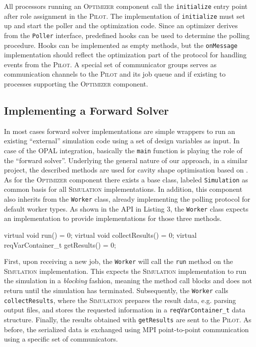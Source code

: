 \documentclass[%
preprint,
preprint,
linenumbers,
amsmath,amssymb,
aps,
prstab,
]{revtex4-1}
\begin{document}
All processors running an \textsc{Optimizer} component call the
  \texttt{initialize} entry point after role assignment in the
  \textsc{Pilot}.
The implementation of \texttt{initialize} must set up and start the poller and
  the optimization code.
Since an optimizer derives from the \texttt{Poller} interface, predefined
  hooks can be used to determine the polling procedure.
Hooks can be implemented as empty methods, but the \texttt{onMessage}
  implementation should reflect the optimization part of the protocol for
  handling events from the \textsc{Pilot}.
A special set of communicator groups serves as communication channels to the
  \textsc{Pilot} and its job queue and if existing to processes supporting the
  \textsc{Optimizer} component.


\subsection{Implementing a Forward Solver}

In most cases forward solver implementations are simple wrappers to run
  an existing ``external'' simulation code using a set of design variables as
  input. In case of the OPAL integration, basically the \texttt{main} function is
  playing the role of the ``forward solver''. Underlying the general nature of our approach, 
  in a similar project, the described methods are used for cavity shape optimisation based on \cite{ARBENZ2008381}. 
As for the \textsc{Optimizer} component there exists a base class, labeled
  \texttt{Simulation} as common basis for all \textsc{Simulation}
  implementations.
In addition, this component also inherits from the \texttt{Worker} class,
  already implementing the polling protocol for default worker types.
As shown in the API in Listing 3, the \texttt{Worker} class expects an
  implementation to provide implementations for those three methods.

\begin{code}
virtual void run() = 0;
virtual void collectResults() = 0;
virtual reqVarContainer_t getResults() = 0;
\end{code}

First, upon receiving a new job, the \texttt{Worker} will call the
  \texttt{run} method on the \textsc{Simulation} implementation.
This expects the \textsc{Simulation} implementation to run the simulation in a
  \textit{blocking} fashion, meaning the method call blocks and does not return
  until the simulation has terminated.
Subsequently, the \texttt{Worker} calls \texttt{collectResults}, where the
  \textsc{Simulation} prepares the result data, e.g. parsing output files,
  and stores the requested information in a \texttt{reqVarContainer\_t} data
  structure.
Finally, the results obtained with \texttt{getResults} are sent to the
  \textsc{Pilot}.
As before, the serialized data is exchanged using MPI point-to-point
  communication using a specific set of communicators.
\end{document}

